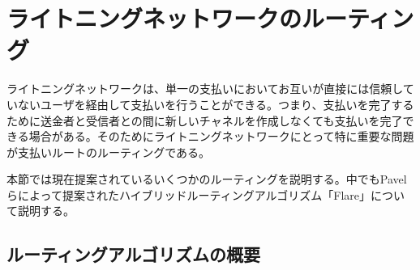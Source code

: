 \documentclass[12pt]{jarticle}
\begin{document}
\section{ライトニングネットワークのルーティング}
ライトニングネットワークは、単一の支払いにおいてお互いが直接には信頼していないユーザを経由して支払いを行うことができる。つまり、支払いを完了するために送金者と受信者との間に新しいチャネルを作成しなくても支払いを完了できる場合がある。そのためにライトニングネットワークにとって特に重要な問題が支払いルートのルーティングである。
\par
本節では現在提案されているいくつかのルーティングを説明する。中でもPavelらによって提案されたハイブリッドルーティングアルゴリズム「Flare」\cite{flare}について説明する。

\subsection{ルーティングアルゴリズムの概要}
\end{document}
